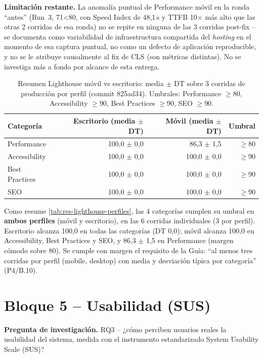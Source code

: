 \textbf{Limitación restante.} La anomalía puntual de Performance móvil
en la ronda ``antes'' (Run~3, 71<80, con Speed Index de 48,1\,s y TTFB
10$\times$ más alto que las otras 2 corridas de esa ronda) no se repite
en ninguna de las 3 corridas post-fix -- se documenta como variabilidad
de infraestructura compartida del \emph{hosting} en el momento de esa
captura puntual, no como un defecto de aplicación reproducible, y no se
le atribuye causalmente al fix de CLS (son métricas distintas). No se
investiga más a fondo por alcance de esta entrega.

\begin{table}[h]
\centering
\small
\begin{tabular}{lrrr}
\toprule
Categoría & Escritorio (media $\pm$ DT) & Móvil (media $\pm$ DT) & Umbral \\
\midrule
Performance & 100,0 $\pm$ 0,0 & 86,3 $\pm$ 1,5 & $\geq$80 \\
Accessibility & 100,0 $\pm$ 0,0 & 100,0 $\pm$ 0,0 & $\geq$90 \\
Best Practices & 100,0 $\pm$ 0,0 & 100,0 $\pm$ 0,0 & $\geq$90 \\
SEO & 100,0 $\pm$ 0,0 & 100,0 $\pm$ 0,0 & $\geq$90 \\
\bottomrule
\end{tabular}
\caption{Resumen Lighthouse móvil vs escritorio: media $\pm$ DT sobre 3 corridas de producción por perfil (commit 825ad34). Umbrales: Performance $\geq$80, Accessibility $\geq$90, Best Practices $\geq$90, SEO $\geq$90.}
\label{tab:res-lighthouse-perfiles}
\end{table}

Como resume \autoref{tab:res-lighthouse-perfiles}, las 4 categorías cumplen su umbral en \textbf{ambos perfiles} (móvil y escritorio), en las 6 corridas individuales (3 por perfil). Escritorio alcanza 100,0 en todas las categorías (DT 0,0); móvil alcanza 100,0 en Accessibility, Best Practices y SEO, y 86,3 $\pm$ 1,5 en Performance (margen cómodo sobre 80). Se cumple con margen el requisito de la Guía: ``al menos tres corridas por perfil (mobile, desktop) con media y desviación típica por categoría'' (P4/B.10).

\section{Bloque 5 -- Usabilidad (SUS)}
\label{sec:res-usabilidad}

\textbf{Pregunta de investigación.} RQ3 -- ¿cómo perciben usuarios reales
la usabilidad del sistema, medida con el instrumento estandarizado System
Usability Scale (SUS)?

